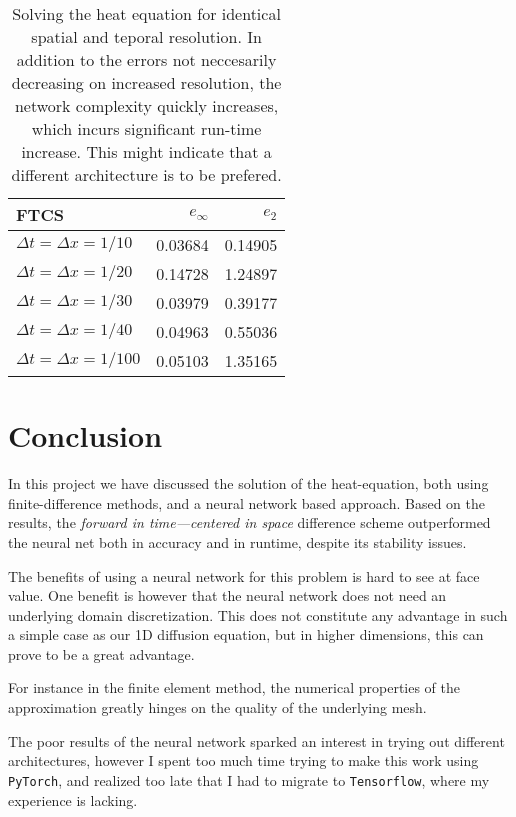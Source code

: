 \documentclass[article, a4paper, oneside]{memoir}
\begin{document}
	\begin{table}[htpb]
		\centering
		\caption{Solving the heat equation for identical spatial and
			teporal resolution.  In addition to the errors not
			neccesarily decreasing on increased resolution, the
			network complexity quickly increases, which incurs
			significant run-time increase. This might indicate that
			a different architecture is to be prefered.
			} 
		\label{tab:nnpde_errors}
		\begin{tabular}{lrr}
			\toprule
			\textsc{FTCS} & \( e_\infty \) & \( e_2 \) \\
			\midrule
			\(\Delta t = \Delta x = 1 / 10 \) & \num{0.03684} & \num{0.14905} \\
			\(\Delta t =  \Delta x = 1 / 20 \) & \num{0.14728} & \num{1.24897} \\
			\(\Delta t =  \Delta x = 1 / 30 \) & \num{0.03979} & \num{0.39177} \\
			\(\Delta t =  \Delta x = 1 / 40 \) & \num{0.04963}& \num{0.55036} \\
			\(\Delta t =  \Delta x = 1 / 100 \) & \num{0.05103} &\num{1.35165} \\
			\bottomrule
		\end{tabular}
	\end{table}

	\chapter{Conclusion}
	
	In this project we have discussed the solution of the heat-equation,
	both using finite-difference methods, and a neural network based
	approach. Based on the results, the \emph{forward in time---centered in
	space} difference scheme outperformed the neural net both in accuracy
	and in runtime, despite its stability issues. 

	The benefits of using a neural network for this problem is hard to see
	at face value. One benefit is however that the neural network does not
	need an underlying domain discretization. This does not constitute any
	advantage in such a simple case as our 1D diffusion equation, but in
	higher dimensions, this can prove to be a great advantage.

	For instance in the finite element method, the numerical properties of
	the approximation greatly hinges on the quality of the underlying mesh. 

	The poor results of the neural network sparked an interest in trying
	out different architectures, however I spent too much time trying to
	make this work using \texttt{PyTorch}, and realized too late that I had
	to migrate to \texttt{Tensorflow}, where my experience is lacking.
	
\end{document}
